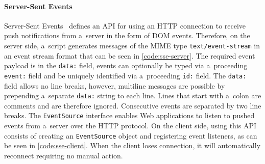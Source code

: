 \documentclass{sig-alternate}
\begin{document}
\paragraph{Server-Sent Events}

Server-Sent Events~\cite{hickson2012sse}
defines an API for using an HTTP connection
to receive push notifications from a~server
in the form of DOM events.
Therefore, on the server side, a~script generates messages
of the MIME type \texttt{text/event-stream}
in an event stream format that can be seen
in \autoref{code:sse-server}.
The required event payload is in the \texttt{data:} field,
events can optionally be typed via a~proceeding \texttt{event:} field
and be uniquely identified via a~proceeding \texttt{id:} field.
The \texttt{data:} field allows no line breaks,
however, multiline messages are possible by prepending
a~separate \texttt{data:} string to each line.
Lines that start with a~colon are comments and are therefore ignored.
Consecutive events are separated by two line breaks.
The \texttt{EventSource} interface enables Web applications
to listen to pushed events from a~server over the HTTP protocol.
On the client side, using this API consists of creating
an \texttt{EventSource} object and registering event listeners,
as can be seen in \autoref{code:sse-client}.
When the client loses connection,
it will automatically reconnect requiring no manual action.
\end{document}
